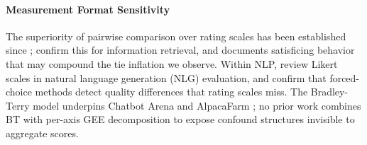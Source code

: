 \paragraph{Measurement Format Sensitivity}
The superiority of pairwise comparison over rating scales has been established since \citet{thurstone1927law}; \citet{carterette2008here} confirm this for information retrieval, and \citet{krosnick1999survey} documents satisficing behavior that may compound the tie inflation we observe.
Within NLP, \citet{amidei2019likert} review Likert scales \citep{likert1932technique} in natural language generation (NLG) evaluation, and \citet{novikova2018rankme} confirm that forced-choice methods detect quality differences that rating scales miss.
The Bradley-Terry model \citep{bradley1952rank} underpins Chatbot Arena \citep{chiang2024chatbot} and AlpacaFarm \citep{dubois2023alpacafarm}; no prior work combines BT with per-axis GEE decomposition to expose confound structures invisible to aggregate scores.
